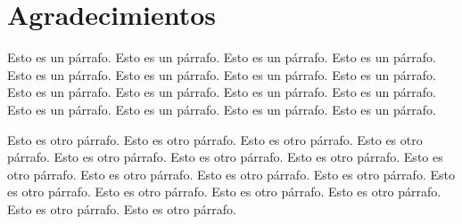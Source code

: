 \hidefromtoc %
\chapter*{Agradecimientos} 
\unhidefromtoc %

Esto es un párrafo. Esto es un párrafo. Esto es un párrafo. Esto es un párrafo. Esto es un párrafo. Esto es un párrafo. Esto es un párrafo. Esto es un párrafo. Esto es un párrafo. Esto es un párrafo. Esto es un párrafo. Esto es un párrafo. Esto es un párrafo. Esto es un párrafo. Esto es un párrafo. Esto es un párrafo. 


Esto es otro párrafo. Esto es otro párrafo. Esto es otro párrafo. Esto es otro párrafo. Esto es otro párrafo. Esto es otro párrafo. Esto es otro párrafo. Esto es otro párrafo. Esto es otro párrafo. Esto es otro párrafo. Esto es otro párrafo. Esto es otro párrafo. Esto es otro párrafo. Esto es otro párrafo. Esto es otro párrafo. Esto es otro párrafo. Esto es otro párrafo. 

\newpage